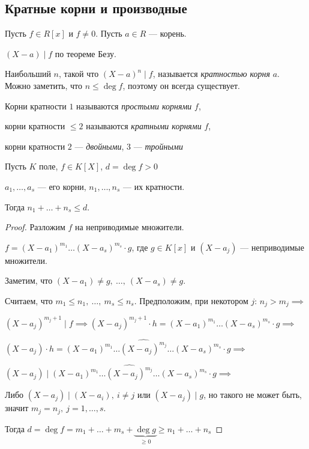 \subsection{Кратные корни и производные}

\begin{defn}
    Пусть $f \in R[x]$ и $f \neq 0$. Пусть $a \in R$ --- корень.

    $(X - a) \mid f$ по теореме Безу.

    Наибольший $n$, такой что $(X - a)^n \mid f$, называется \emph{кратностью корня} $a$. Можно заметить, что $n \leq \deg f$, поэтому он всегда существует.

    Корни кратности $1$ называются \emph{простыми корнями} $f$,

    корни кратности $\leq 2$ называются \emph{кратными корнями} $f$,

    корни кратности $2$ --- \emph{двойными}, $3$ --- \emph{тройными}
\end{defn}

\begin{theorem}
    Пусть $K$ поле, $f \in K[X]$, $d = \deg f > 0$

    $a_1, \ldots, a_s$ --- его корни, $n_1, \ldots, n_s$ --- их кратности.

    Тогда $n_1 + \ldots + n_s \leq d$.
\end{theorem}

\begin{proof}
    Разложим $f$ на неприводимые множители.

    $f = (X - a_1)^{m_1} \ldots (X - a_s)^{m_s} \cdot g$, где $g \in K[x]$ и $(X - a_j)$ --- неприводимые множители.

    Заметим, что $(X - a_1) \neq g,~ \ldots,~ (X - a_s) \neq g$.
    
    Считаем, что $m_1 \leq n_1,~ \ldots,~ m_s \leq n_s$. Предположим, при некотором $j$: $n_j > m_j \implies$

    $(X - a_j)^{m_j + 1} \mid f \implies (X - a_j)^{m_j + 1} \cdot h = (X - a_1)^{m_1} \ldots (X - a_s)^{m_s} \cdot g \implies$
 
    $(X - a_j) \cdot h = (X - a_1)^{m_1} \ldots \widehat{(X - a_j)^{m_j}} \ldots (X - a_s)^{m_s} \cdot g \implies$

    $(X - a_j) \mid (X - a_1)^{m_1} \ldots \widehat{(X - a_j)^{m_j}} \ldots (X - a_s)^{m_s} \cdot g \implies$
    
    Либо $(X - a_j) \mid (X - a_i),~ i \neq j$ или $(X - a_j) \mid g$, но такого не может быть, значит $m_j = n_j,~ j = 1, \ldots, s$.

    Тогда $d = \deg f = m_1 + \ldots + m_s + \underbrace{\deg g}_{\geq 0} \geq n_1 + \ldots + n_s$
\end{proof}

